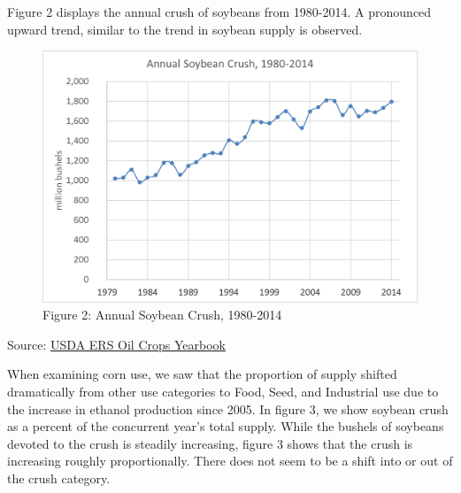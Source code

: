 \documentclass[
  letterpaper,
  DIV=11,
  numbers=noendperiod]{scrreprt}
\begin{document}
Figure 2 displays the annual crush of soybeans from 1980-2014. A
pronounced upward trend, similar to the trend in soybean supply is
observed.

\begin{figure}

{\centering \includegraphics{Excel-files/ForecastingUseSoy-OilCropsYearbook_files/image005.png}

}

\caption{Figure 2: Annual Soybean Crush, 1980-2014}

\end{figure}

Source:
\href{http://www.ers.usda.gov/data-products/oil-crops-yearbook.aspx}{USDA
ERS Oil Crops Yearbook}

When examining corn use, we saw that the proportion of supply shifted
dramatically from other use categories to Food, Seed, and Industrial use
due to the increase in ethanol production since 2005. In figure 3, we
show soybean crush as a percent of the concurrent year's total supply.
While the bushels of soybeans devoted to the crush is steadily
increasing, figure 3 shows that the crush is increasing roughly
proportionally. There does not seem to be a shift into or out of the
crush category.
\end{document}
